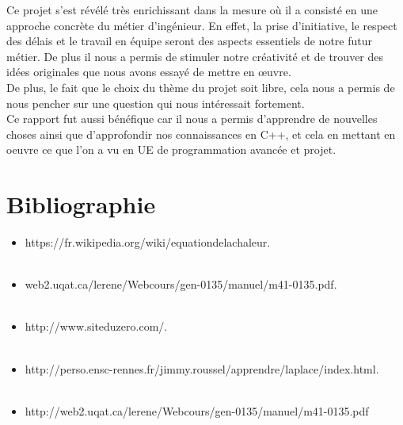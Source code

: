 \documentclass[french]{report}
\begin{document}
Ce projet s’est révélé très enrichissant dans la mesure où il a consisté en une approche concrète du métier d’ingénieur. En effet, la prise d’initiative, le respect des délais et le travail en équipe seront des aspects essentiels de notre futur métier. 
De plus il nous a permis de stimuler notre créativité et de trouver des idées originales que nous avons essayé de mettre en œuvre.\\

De plus, le fait que le choix du thème du projet soit libre, cela nous a permis de nous pencher sur une question qui nous intéressait fortement. \\

Ce rapport fut aussi bénéfique car il nous a permis d'apprendre de nouvelles choses ainsi que d'approfondir nos connaissances en C++, et cela en mettant en oeuvre ce que l'on a vu en UE de programmation avancée et projet. 


\chapter{Bibliographie}


\begin{itemize}
    \item https://fr.wikipedia.org/wiki/equationdelachaleur. \\\\

    \item web2.uqat.ca/lerene/Webcours/gen-0135/manuel/m41-0135.pdf. \\\\
    
    \item  http://www.siteduzero.com/. \\\\
    
    \item http://perso.ensc-rennes.fr/jimmy.roussel/apprendre/laplace/index.html.\\\\
    
    \item http://web2.uqat.ca/lerene/Webcours/gen-0135/manuel/m41-0135.pdf
    

\end{itemize}
\end{document}
